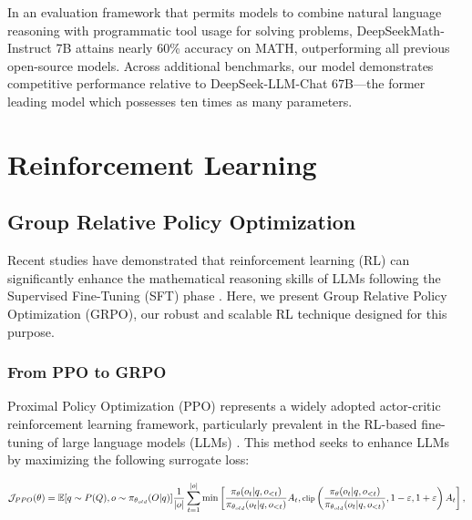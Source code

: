 \begin{itemize}[topsep=0pt]
In an evaluation framework that permits models to combine natural language reasoning with programmatic tool usage for solving problems, DeepSeekMath-Instruct 7B attains nearly 60\% accuracy on MATH, outperforming all previous open-source models. Across additional benchmarks, our model demonstrates competitive performance relative to DeepSeek-LLM-Chat 67B—the former leading model which possesses ten times as many parameters.  
\section{Reinforcement Learning}

\subsection{Group Relative Policy Optimization} Recent studies have demonstrated that reinforcement learning (RL) can significantly enhance the mathematical reasoning skills of LLMs following the Supervised Fine-Tuning (SFT) phase \citep{wang2023math,wizardmath}. Here, we present Group Relative Policy Optimization (GRPO), our robust and scalable RL technique designed for this purpose.

\subsubsection{From PPO to GRPO} Proximal Policy Optimization (PPO) \citep{schulman2017proximal} represents a widely adopted actor-critic reinforcement learning framework, particularly prevalent in the RL-based fine-tuning of large language models (LLMs) \citep{ouyang2022training}. This method seeks to enhance LLMs by maximizing the following surrogate loss:

\begin{equation}
\footnotesize
    \mathcal{J}_{PPO}(\theta) = \mathbb{E}{[q \sim P(Q), o \sim \pi_{\theta_{old}}(O|q)]} \frac{1}{|o|} \sum_{t=1}^{|o|} \min \left[ \frac{\pi_\theta(o_{t} | q, o_{<t})}{\pi_{\theta_{old}}(o_{t} | q, o_{<t})} A_{t}, \text{clip} \left( \frac{\pi_\theta(o_{t} | q, o_{<t})}{\pi_{\theta_{old}}(o_{t} | q, o_{<t})}, 1 - \varepsilon, 1 + \varepsilon \right)  A_{t} \right] ,
\end{equation}


\end{itemize}
